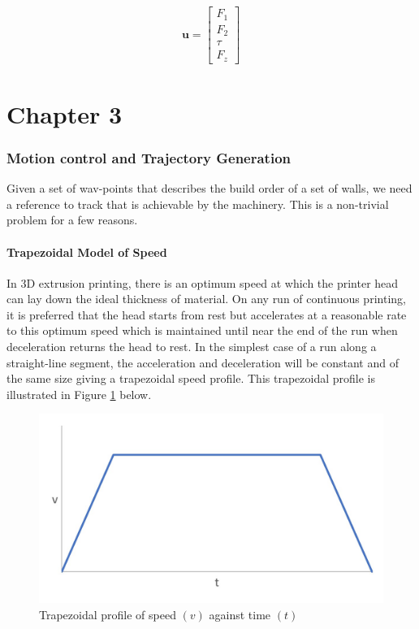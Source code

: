 \documentclass{UoNMCHA}
\numberwithin{equation}{section}
\begin{document}
\begin{align}
\boldsymbol{u}=\left[\begin{array}{c}
	F_{1} \\
	F_{2} \\
	\tau \\
	F_{z}
\end{array}\right]
\end{align}

	\newpage
	
	\part*{Chapter 3}
	
	\section{Motion control and Trajectory Generation}
	
	Given a set of wav-points that describes the build order of a set of walls, we need a reference to track
	that is achievable by the machinery. This is a non-trivial problem for a few reasons.
	\subsection{Trapezoidal Model of Speed}
	In $3 \mathrm{D}$ extrusion printing, there is an optimum speed at which the printer head can lay down the ideal
	thickness of material. On any run of continuous printing, it is preferred that the head starts from rest but
	accelerates at a reasonable rate to this optimum speed which is maintained until near the end of the run
	when deceleration returns the head to rest. In the simplest case of a run along a straight-line segment,
	the acceleration and deceleration will be constant and of the same size giving a trapezoidal speed profile.
	This trapezoidal profile is illustrated in Figure \ref{figs/Picture9} below.
	
	\begin{figure}[H]
		\begin{center}
			\includegraphics[width=.8\linewidth]{figs/Picture9}
			\caption{Trapezoidal profile of speed $ (v) $ against time $ (t) $}
			\label{figs/Picture9}
		\end{center}
	\end{figure}
	
\end{document}
